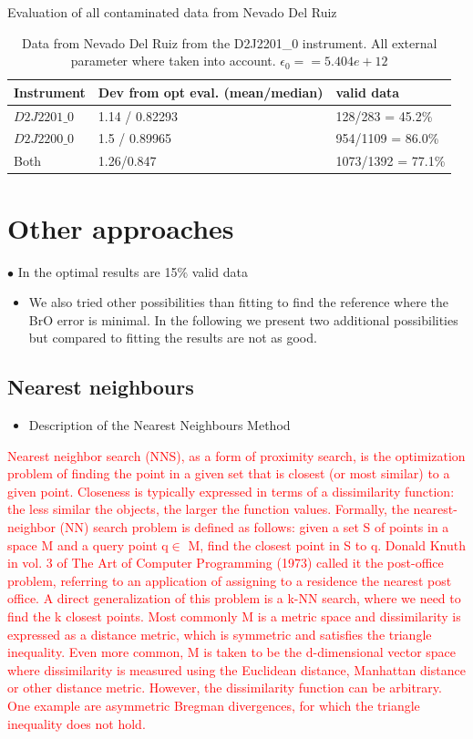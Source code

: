 \documentclass  [
  paper    = a4,
  BCOR     = 10mm,
  twoside,
  fontsize = 12pt,
  fleqn,
  toc      = bibnumbered,
  toc      = listofnumbered,
  numbers  = noendperiod,
  headings = normal,
  listof   = leveldown,
  version  = 3.03
]                                       {scrreprt}
\begin{document}
	\begin{table}[h]
		\centering
		{Evaluation of all contaminated data from Nevado Del Ruiz}
		\vspace*{1cm}
		\begin{tabular}{|p{2.2cm}|p{4.4cm}|p{5.0cm}|}
			\toprule
			Instrument& Dev from opt eval. (mean/median) & valid data\\
			\toprule
			$D2J2201\_0$ &1.14 / 0.82293& 128/283 = 45.2\%\\
			\midrule
			$D2J2200\_0$ &1.5 / 0.89965&954/1109 = 86.0\%\\
			\midrule 
			Both &1.26/0.847&1073/1392 = 77.1\%\\
			\bottomrule
		\end{tabular}
	\caption{Data from Nevado Del Ruiz from the D2J2201\_0 instrument. All external parameter where taken into account. $\epsilon_{0} = =  5.404e+12$}
	\end{table}
	\section{Other approaches}

	$\bullet$ In the optimal results are 15$\%$ valid data
	\begin{itemize}
		\item We also tried other possibilities than fitting to find the reference where the BrO error is minimal. In the following we present two additional possibilities but compared to fitting the results are not as good.
	\end{itemize}
	\subsection{Nearest neighbours}
	\begin{itemize}
		\item Description of the Nearest Neighbours Method
	\end{itemize}
		\textcolor{red}{Nearest neighbor search (NNS), as a form of proximity search, is the optimization problem of finding the point in a given set that is closest (or most similar) to a given point. Closeness is typically expressed in terms of a dissimilarity function: the less similar the objects, the larger the function values. Formally, the nearest-neighbor (NN) search problem is defined as follows: given a set S of points in a space M and a query point q$\in$ M, find the closest point in S to q. Donald Knuth in vol. 3 of The Art of Computer Programming (1973) called it the post-office problem, referring to an application of assigning to a residence the nearest post office. A direct generalization of this problem is a k-NN search, where we need to find the k closest points.	
		Most commonly M is a metric space and dissimilarity is expressed as a distance metric, which is symmetric and satisfies the triangle inequality. Even more common, M is taken to be the d-dimensional vector space where dissimilarity is measured using the Euclidean distance, Manhattan distance or other distance metric. However, the dissimilarity function can be arbitrary. One example are asymmetric Bregman divergences, for which the triangle inequality does not hold.}
\end{document}
